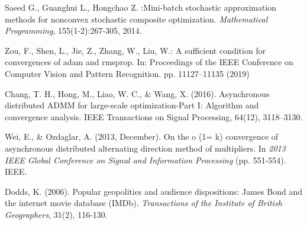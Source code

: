 \documentclass[twoside]{article}
\begin{document}
\begin{multicols}{2}
\begin{thebibliography}{99}
Saeed G., Guanghui L., Hongchao Z. :Mini-batch stochastic approximation methods
for nonconvex stochastic composite optimization. \textit{Mathematical Programming}, 155(1-2):267-305,
2014.

Zou, F., Shen, L., Jie, Z., Zhang, W., Liu, W.: A sufficient condition for convergences of adam and rmsprop. In: Proceedings of the IEEE Conference on Computer Vision and Pattern Recognition. pp. 11127--11135 (2019)

Chang, T. H., Hong, M., Liao, W. C., \& Wang, X. (2016). Asynchronous distributed ADMM for large-scale optimization-Part I: Algorithm and convergence analysis. IEEE Transactions on Signal Processing, 64(12), 3118--3130.

Wei, E., \& Ozdaglar, A. (2013, December). On the o (1= k) convergence of asynchronous distributed alternating direction method of multipliers. In {\it 2013 IEEE Global Conference on Signal and Information Processing} (pp. 551-554). IEEE.

Dodds, K. (2006). Popular geopolitics and audience dispositions: James Bond and the internet movie database (IMDb). {\it Transactions of the Institute of British Geographers}, 31(2), 116-130.









\end{thebibliography}
\end{multicols}
\end{document}
